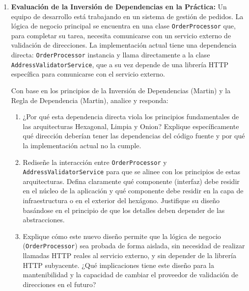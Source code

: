 \documentclass[12pt,a4paper]{article}
\begin{document}
\begin{enumerate}[label=\textbf{\arabic*.}, leftmargin=*, itemsep=1.2em]
  Basado en los conceptos de Domain-Driven Design (Evans) y Bounded Context (Richards \& Ford), explique cómo dividiría este sistema en varios contextos delimitados. ¿Cómo evitaría que el modelo de Póliza se contamine con detalles de siniestros o facturación? ¿Cómo se comunicarían estos contextos de manera desacoplada? Relacione esta solución con la implementación de una Arquitectura Orientada al Dominio (como Onion o Clean) y la creación de un Adaptador de Servicio para la comunicación externa, tal como se describe en la Guía de Arquitectura N-Capas.

  \item \textbf{Evaluación de la Inversión de Dependencias en la Práctica:}
  Un equipo de desarrollo está trabajando en un sistema de gestión de pedidos. La lógica de negocio principal se encuentra en una clase \texttt{OrderProcessor} que, para completar su tarea, necesita comunicarse con un servicio externo de validación de direcciones. La implementación actual tiene una dependencia directa: \texttt{OrderProcessor} instancia y llama directamente a la clase \texttt{AddressValidatorService}, que a su vez depende de una librería HTTP específica para comunicarse con el servicio externo.

  Con base en los principios de la Inversión de Dependencias (Martin) y la Regla de Dependencia (Martin), analice y responda:
  \begin{enumerate}[label=\alph*), leftmargin=1.5em, itemsep=0.6em]
    \item ¿Por qué esta dependencia directa viola los principios fundamentales de las arquitecturas Hexagonal, Limpia y Onion? Explique específicamente qué dirección deberían tener las dependencias del código fuente y por qué la implementación actual no la cumple.
    \item Rediseñe la interacción entre \texttt{OrderProcessor} y \texttt{AddressValidatorService} para que se alinee con los principios de estas arquitecturas. Defina claramente qué componente (interfaz) debe residir en el núcleo de la aplicación y qué componente debe residir en la capa de infraestructura o en el exterior del hexágono. Justifique su diseño basándose en el principio de que los detalles deben depender de las abstracciones.
    \item Explique cómo este nuevo diseño permite que la lógica de negocio (\texttt{OrderProcessor}) sea probada de forma aislada, sin necesidad de realizar llamadas HTTP reales al servicio externo, y sin depender de la librería HTTP subyacente. ¿Qué implicaciones tiene este diseño para la mantenibilidad y la capacidad de cambiar el proveedor de validación de direcciones en el futuro?
  \end{enumerate}


\end{enumerate}
\end{document}
